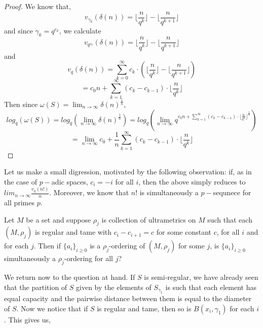 \begin{proof}
	We know that,
\[v_{\gamma_k}(\delta(n)) =  \lfloor\frac{n}{q^k}\rfloor - \lfloor\frac{n}{q^{k+1}}\rfloor \]
and since $\gamma_k = q^{c_k}$, we calculate
\[v_{q^{c_k}}(\delta(n)) =  \lfloor\frac{n}{q^k}\rfloor - \lfloor\frac{n}{q^{k+1}}\rfloor \]
and
\[v_{q}(\delta(n)) =  \sum_{k=0}^{\infty} c_k \cdot(\lfloor\frac{n}{q^k}\rfloor - \lfloor\frac{n}{q^{k+1}}\rfloor) \]
\[=  c_0n + \sum_{k=1}^{\infty} (c_{k} - c_{k-1}) \cdot \lfloor\frac{n}{q^{k}}\rfloor \]
Then since $\omega(S) = \lim_{n\to\infty} \delta(n) ^{\frac{1}{n}}$,
\[log_q(\omega(S)) = log_q(\lim_{n\to\infty} \delta(n) ^{\frac{1}{n}}) = log_q(\lim_{n\to\infty}q^{{c_0n + \sum_{k=1}^{\infty} (c_{k} - c_{k-1}) \cdot \lfloor\frac{n}{q^{k}}\rfloor}^{\frac{1}{n}}})\]
 \[=\lim_{n\to\infty} c_0 + \frac{1}{n}\sum_{k=1}^{\infty} (c_{k} - c_{k-1}) \cdot \lfloor\frac{n}{q^{k}}\rfloor \] 
\end{proof}

Let us make a small digression, motivated by the following observation: if, as in the case of $p-$adic spaces, $c_i=-i$ for all $i$, then the above simply reduces to $lim_{n\to\infty} \frac{v_q(n!)}{n} $. Moreover, we know that $n!$ is simultaneously a $p-$sequnece for all primes $p$.  

\begin{question}
	Let $M$ be a set and suppose $\rho_j$ is collection of ultrametrics on $M$ such that each $(M,\rho_j)$ is regular and tame with $c_i-c_{i+1}=c$ for some constant $c$, for all $i$ and for each $j$. Then if $\{a_i\}_{i \geq 0 }$ is a $\rho_j$-ordering of $(M,\rho_j)$ for some $j$, is $\{a_i\}_{i \geq 0 }$ simultaneously a $\rho_j$-ordering for all $j$?
\end{question}

We return now to the question at hand. If $S$ is semi-regular, we have already seen that the partition of $S$ given by the elements of $S_{\gamma_1}$ is such that each element has equal capacity and the pairwise distance between them is equal to the diameter of $S$. Now we notice that if $S$ is regular and tame, then so is $B(x_i,\gamma_1)$ for each $i$. This gives us, 

